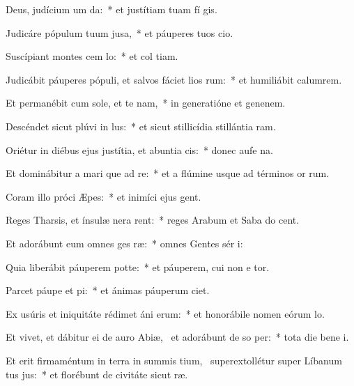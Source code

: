 \item Deus, judícium um  da:~* et justítiam tuam fí gis.
\item Judicáre pópulum tuum  jusa,~* et páuperes tuos  cio.
\item Suscípiant montes cem lo:~* et col tiam.
\item Judicábit páuperes pópuli, et salvos fáciet lios rum:~* et humiliábit calumrem.
\item Et permanébit cum sole, et te nam,~* in generatióne et genenem.
\item Descéndet sicut plúvi in lus:~* et sicut stillicídia stillántia  ram.
\item Oriétur in diébus ejus justítia, et abuntia cis:~* donec aufe na.
\item Et dominábitur a mari que ad re:~* et a flúmine usque ad términos or rum.
\item Coram illo próci Æpes:~* et inimíci ejus  gent.
\item Reges Tharsis, et ínsulæ nera rent:~* reges Arabum et Saba do cent.
\item Et adorábunt eum omnes ges ræ:~* omnes Gentes sér i:
\item Quia liberábit páuperem  potte:~* et páuperem, cui non e tor.
\item Parcet páupe et pi:~* et ánimas páuperum  ciet.
\item Ex usúris et iniquitáte rédimet áni erum:~* et honorábile nomen eórum  lo.
\item Et vivet, et dábitur ei de auro Abiæ,~\pscross{} et adorábunt de so per:~* tota die bene i.
\item Et erit firmaméntum in terra in summis tium,~\pscross{} superextollétur super Líbanum tus jus:~* et florébunt de civitáte sicut  ræ.
